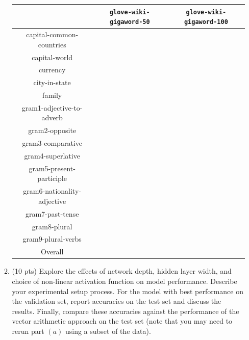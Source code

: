 \documentclass{article}
\begin{document}
\begin{enumerate}
\begin{enumerate}
        \begin{center}
            \hspace*{-1cm}\begin{tabular}{c||c|c|}
             & \texttt{glove-wiki-gigaword-50} & \texttt{glove-wiki-gigaword-100} \\ \hline \hline
            capital-common-countries & & \\ \hline
            capital-world & & \\ \hline
            currency & & \\ \hline
            city-in-state & & \\ \hline
            family & & \\ \hline
            gram1-adjective-to-adverb & & \\ \hline
            gram2-opposite & & \\ \hline
            gram3-comparative & & \\ \hline
            gram4-superlative & & \\ \hline
            gram5-present-participle & & \\ \hline
            gram6-nationality-adjective & & \\ \hline
            gram7-past-tense & & \\ \hline
            gram8-plural & & \\ \hline
            gram9-plural-verbs & & \\ \hline
            Overall & & \\ \hline
            \end{tabular}
        \end{center}

        \item (10 pts) Explore the effects of network depth, hidden layer width, and choice of non-linear activation function on model performance. Describe your experimental setup process. For the model with best performance on the validation set, report accuracies on the test set and discuss the results. Finally, compare these accuracies against the performance of the vector arithmetic approach on the test set (note that you may need to rerun part $(a)$ using a subset of the data).


\end{enumerate}
\end{enumerate}
\end{document}
